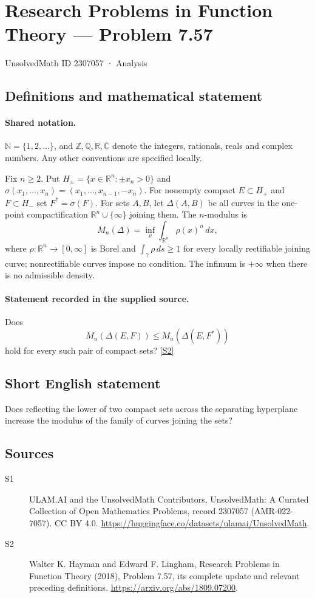 \documentclass[11pt]{article}
\newcommand{\sref}[2]{\hyperlink{source:#1:#2}{[S#2]}}
\begin{document}
\setcounter{section}{2307056}
\section{Research Problems in Function Theory — Problem 7.57}\label{2307057}
{\small\sffamily UnsolvedMath ID 2307057 · Analysis}
\subsection{Definitions and mathematical statement}

\paragraph{Shared notation.}$\mathbb N=\{1,2,\ldots\}$, and $\mathbb Z,\mathbb Q,\mathbb R,\mathbb C$ denote the integers, rationals, reals and complex numbers. Any other conventions are specified locally.


Fix $n\ge2$. Put $H_\pm=\{x\in\mathbb R^n:\pm x_n>0\}$ and $\sigma(x_1,\ldots,x_n)=(x_1,\ldots,x_{n-1},-x_n)$. For nonempty compact $E\subset H_+$ and $F\subset H_-$ set $F^*=\sigma(F)$. For sets $A,B$, let $\Delta(A,B)$ be all curves in the one-point compactification $\mathbb R^n\cup\{\infty\}$ joining them. The $n$-modulus is
\[M_n(\Delta)=\inf_\rho\int_{\mathbb R^n}\rho(x)^n\,dx,
\]
where $\rho:\mathbb R^n\to[0,\infty]$ is Borel and $\int_\gamma\rho\,ds\ge1$ for every locally rectifiable joining curve; nonrectifiable curves impose no condition. The infimum is $+\infty$ when there is no admissible density.
\paragraph{Statement recorded in the supplied source.}
Does
\[M_n(\Delta(E,F))\le M_n(\Delta(E,F^*))
\]
hold for every such pair of compact sets? \sref{2307057}{2}
\subsection{Short English statement}
Does reflecting the lower of two compact sets across the separating hyperplane increase the modulus of the family of curves joining the sets?
\subsection{Sources}
\begin{description}
\item[\hypertarget{source:2307057:1}{S1}] ULAM.AI and the UnsolvedMath Contributors, UnsolvedMath: A Curated Collection of Open Mathematics Problems, record 2307057 (AMR-022-7057). CC BY 4.0. \url{https://huggingface.co/datasets/ulamai/UnsolvedMath}.
\item[\hypertarget{source:2307057:2}{S2}] Walter K. Hayman and Edward F. Lingham, Research Problems in Function Theory (2018), Problem 7.57, its complete update and relevant preceding definitions. \url{https://arxiv.org/abs/1809.07200}.
\end{description}
\label{end:2307057}
\end{document}
